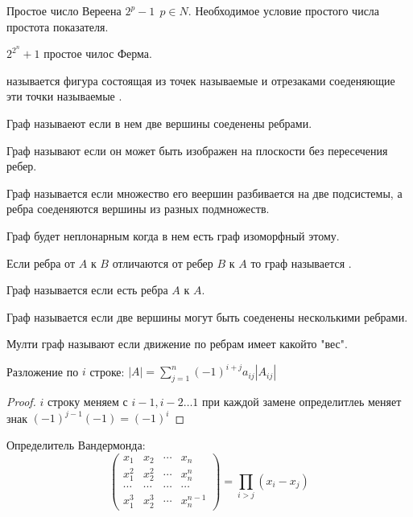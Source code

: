   Простое число Вереена $2^p -1 ~~ p \in N$. Необходимое условие простого числа
простота показателя.

  $2^{2^n} + 1$ простое чилос Ферма.

   называется фигура состоящая из точек называемые 
и отрезаками соеденяющие эти точки называемые .

  Граф называеют  если в нем две вершины соеденены ребрами.

  Граф называют  если он может быть
изображен на плоскости без пересечения ребер.

  Граф называется  если множество его веершин
разбивается на две подсистемы, а ребра соеденяются вершины из разных
подмножеств.

  Граф будет неплонарным когда в нем есть граф изоморфный этому.

  Если ребра от $A$ к $B$ отличаются от ребер $B$ к $A$ то граф называется
.

  Граф называется  если есть ребра $A$ к $A$.

  Граф называется  если две вершины могут быть соеденены
несколькими ребрами.

  Мулти граф называют  если движение по ребрам имеет
какойто "вес".

\begin{theorem}
  Разложение по $i$ строке: $|A| = \sum_{j=1}^n (-1)^{i+j} a_{ij} |A_{ij}|$
\end{theorem}

\begin{proof}
  $i$ строку меняем с $i-1, i-2 \ldots 1$ при каждой замене определитлеь
  меняет знак $(-1)^{j-1} (-1) = (-1)^i$
\end{proof}

  Определитель Вандермонда:
\begin{displaymath}
  \left(
  \begin{array}{ccccl}
    x_1   & x_2   & \cdots & x_n \\
    x_1^2 & x_2^2 & \cdots & x_n^n\\
    \cdots & \cdots & \cdots & \cdots\\
    x_1^3 & x_2^3 & \cdots & x_n^{n-1}
  \end{array}
  \right)
  = \prod_{i>j}(x_i - x_j)
\end{displaymath}

